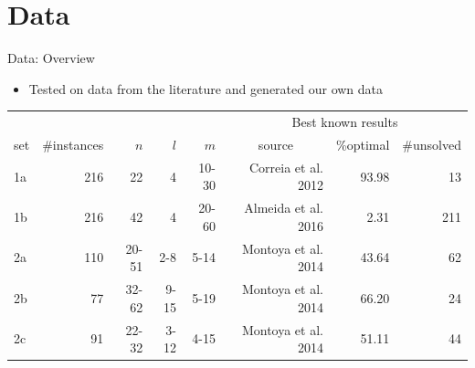 \documentclass{beamer}
\begin{document}
\section{Data}
\begin{frame}{Data: Overview}
	\begin{itemize}
		\item Tested on data from the literature and generated our own data\pause
	\end{itemize}
\begin{table}[tpb]
	\begin{adjustwidth}{-0.5cm}{}
    \setlength{\tabcolsep}{3pt}
    \centering
    \small
	\begin{tabular}{@{}lrrrrrrr@{}}
		\toprule
		&  &  &  &  & \multicolumn{3}{c}{Best known results}\\ 
        \cmidrule(l){6-8} 
		set & \multicolumn{1}{l}{\#instances} & $n$ & $l$ & $m$ & \multicolumn{1}{c}{source} & \multicolumn{1}{r}{\%optimal} & {\color{red} \#unsolved} \\ \midrule
		1a     & 216 & 22 & 4 & 10-30 & Correia et al. 2012 & 93.98 & {\color{red} 13}\\
		1b     & 216& 42 & 4 & 20-60 & Almeida et al. 2016 & 2.31 & {\color{red} 211} \\ \midrule\pause
		2a     & 110 & 20-51 & 2-8 & 5-14 & Montoya et al. 2014 & 43.64 & {\color{red} 62} \\
		2b     & 77 & 32-62 & 9-15 & 5-19 & Montoya et al. 2014 & 66.20 & {\color{red} 24} \\
		2c     & 91 & 22-32 & 3-12 & 4-15 & Montoya et al. 2014 & 51.11 & {\color{red} 44} \\ \bottomrule
	\end{tabular}
    \end{adjustwidth}
	\label{tab:data}
\end{table}

\end{frame}
\end{document}
